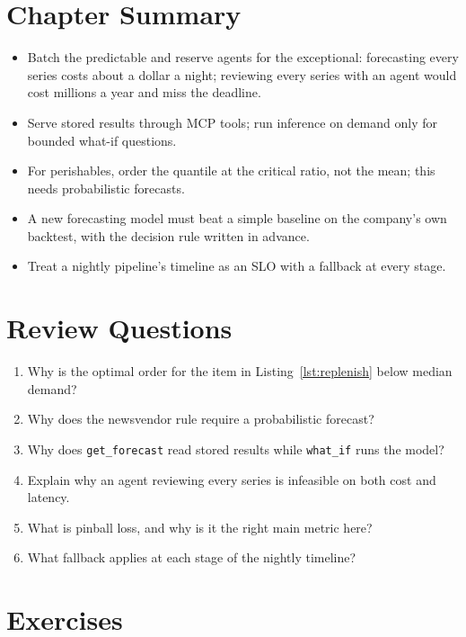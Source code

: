 \section*{Chapter Summary}

\begin{itemize}[itemsep=2pt]
  \item Batch the predictable and reserve agents for the exceptional: forecasting every series costs about a dollar a night; reviewing every series with an agent would cost millions a year and miss the deadline.
  \item Serve stored results through MCP tools; run inference on demand only for bounded what-if questions.
  \item For perishables, order the quantile at the critical ratio, not the mean; this needs probabilistic forecasts.
  \item A new forecasting model must beat a simple baseline on the company's own backtest, with the decision rule written in advance.
  \item Treat a nightly pipeline's timeline as an SLO with a fallback at every stage.
\end{itemize}

\section*{Review Questions}

\begin{enumerate}[itemsep=2pt]
  \item Why is the optimal order for the item in Listing~\ref{lst:replenish} below median demand?
  \item Why does the newsvendor rule require a probabilistic forecast?
  \item Why does \texttt{get\_forecast} read stored results while \texttt{what\_if} runs the model?
  \item Explain why an agent reviewing every series is infeasible on both cost and latency.
  \item What is pinball loss, and why is it the right main metric here?
  \item What fallback applies at each stage of the nightly timeline?
\end{enumerate}

\section*{Exercises}


